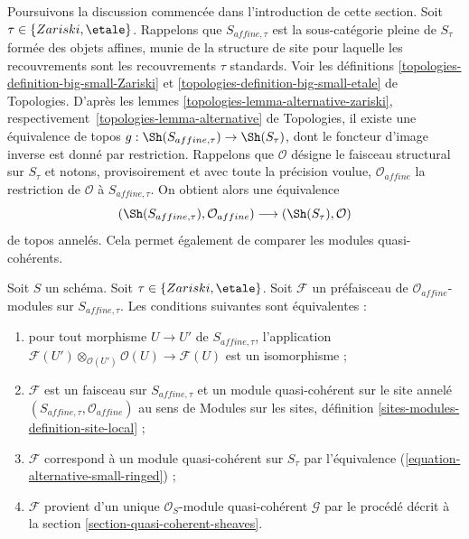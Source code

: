 \noindent
Poursuivons la discussion commencée dans l'introduction de cette section.
Soit $\tau \in \{Zariski, \etale\}$. Rappelons que $S_{affine, \tau}$ est la
sous-catégorie pleine de $S_\tau$ formée des objets affines, munie de la
structure de site pour laquelle les recouvrements sont les recouvrements
$\tau$ standards. Voir les définitions
\ref{topologies-definition-big-small-Zariski} et
\ref{topologies-definition-big-small-etale} de Topologies. D'après les lemmes
\ref{topologies-lemma-alternative-zariski}, respectivement\  
\ref{topologies-lemma-alternative} de Topologies, il existe une équivalence de topos
$g : \Sh(S_{affine, \tau}) \to \Sh(S_\tau)$, dont le foncteur d'image inverse
est donné par restriction. Rappelons que $\mathcal{O}$ désigne le faisceau
structural sur $S_\tau$ et notons, provisoirement et avec toute la précision
voulue, $\mathcal{O}_{affine}$ la restriction de $\mathcal{O}$ à
$S_{affine, \tau}$. On obtient alors une équivalence
\begin{equation}
\label{equation-alternative-small-ringed}
(\Sh(S_{affine, \tau}), \mathcal{O}_{affine})
\longrightarrow
(\Sh(S_\tau), \mathcal{O})
\end{equation}
de topos annelés. Cela permet également de comparer les modules
quasi-cohérents.

\begin{lemma}
\label{lemma-quasi-coherent-alternative-small}
Soit $S$ un schéma. Soit $\tau \in \{Zariski, \etale\}$.
Soit $\mathcal{F}$ un préfaisceau de $\mathcal{O}_{affine}$-modules sur
$S_{affine, \tau}$. Les conditions suivantes sont équivalentes :
\begin{enumerate}
\item pour tout morphisme $U \to U'$ de $S_{affine, \tau}$, l'application
$\mathcal{F}(U') \otimes_{\mathcal{O}(U')} \mathcal{O}(U) \to \mathcal{F}(U)$
est un isomorphisme ;
\item $\mathcal{F}$ est un faisceau sur $S_{affine, \tau}$ et un module
quasi-cohérent sur le site annelé
$(S_{affine, \tau}, \mathcal{O}_{affine})$ au sens de Modules sur les sites,
définition \ref{sites-modules-definition-site-local} ;
\item $\mathcal{F}$ correspond à un module quasi-cohérent sur $S_\tau$ par
l'équivalence (\ref{equation-alternative-small-ringed}) ;
\item $\mathcal{F}$ provient d'un unique $\mathcal{O}_S$-module
quasi-cohérent $\mathcal{G}$ par le procédé décrit à la section
\ref{section-quasi-coherent-sheaves}.
\end{enumerate}
\end{lemma}

